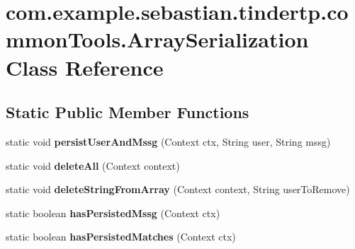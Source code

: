 \hypertarget{classcom_1_1example_1_1sebastian_1_1tindertp_1_1commonTools_1_1ArraySerialization}{}\section{com.\+example.\+sebastian.\+tindertp.\+common\+Tools.\+Array\+Serialization Class Reference}
\label{classcom_1_1example_1_1sebastian_1_1tindertp_1_1commonTools_1_1ArraySerialization}
\subsection*{Static Public Member Functions}
\begin{DoxyCompactItemize}
\item 
static void {\bfseries persist\+User\+And\+Mssg} (Context ctx, String user, String mssg)\hypertarget{classcom_1_1example_1_1sebastian_1_1tindertp_1_1commonTools_1_1ArraySerialization_a78c724ccfa96d1a6c168f7a4d417acb1}{}\label{classcom_1_1example_1_1sebastian_1_1tindertp_1_1commonTools_1_1ArraySerialization_a78c724ccfa96d1a6c168f7a4d417acb1}

\item 
static void {\bfseries delete\+All} (Context context)\hypertarget{classcom_1_1example_1_1sebastian_1_1tindertp_1_1commonTools_1_1ArraySerialization_a62582fe2d3820c1e6c165f89248737f4}{}\label{classcom_1_1example_1_1sebastian_1_1tindertp_1_1commonTools_1_1ArraySerialization_a62582fe2d3820c1e6c165f89248737f4}

\item 
static void {\bfseries delete\+String\+From\+Array} (Context context, String user\+To\+Remove)\hypertarget{classcom_1_1example_1_1sebastian_1_1tindertp_1_1commonTools_1_1ArraySerialization_aec11c0960c8ad2eea8e61aee8e22b276}{}\label{classcom_1_1example_1_1sebastian_1_1tindertp_1_1commonTools_1_1ArraySerialization_aec11c0960c8ad2eea8e61aee8e22b276}

\item 
static boolean {\bfseries has\+Persisted\+Mssg} (Context ctx)\hypertarget{classcom_1_1example_1_1sebastian_1_1tindertp_1_1commonTools_1_1ArraySerialization_a00bd808527962e2a8dc4e61fa0790129}{}\label{classcom_1_1example_1_1sebastian_1_1tindertp_1_1commonTools_1_1ArraySerialization_a00bd808527962e2a8dc4e61fa0790129}

\item 
static boolean {\bfseries has\+Persisted\+Matches} (Context ctx)\hypertarget{classcom_1_1example_1_1sebastian_1_1tindertp_1_1commonTools_1_1ArraySerialization_a0df8bc47cbdc075f004ea005d690c82c}{}\label{classcom_1_1example_1_1sebastian_1_1tindertp_1_1commonTools_1_1ArraySerialization_a0df8bc47cbdc075f004ea005d690c82c}


\end{DoxyCompactItemize}
